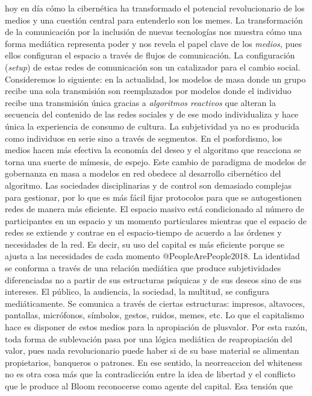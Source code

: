 \documentclass[
]{article}
\begin{document}
hoy en día cómo la cibernética ha transformado el potencial
revolucionario de los medios y una cuestión central para entenderlo son
los memes. La transformación de la comunicación por la inclusión de
nuevas tecnologías nos muestra cómo una forma mediática representa poder
y nos revela el papel clave de los \emph{medios,} pues ellos configuran
el espacio a través de flujos de comunicación. La configuración
(\emph{setup}) de estas redes de comunicación son un catalizador para el
cambio social. Consideremos lo siguiente: en la actualidad, los modelos
de masa donde un grupo recibe una sola transmisión son reemplazados por
modelos donde el individuo recibe una transmisión única gracias a
\emph{algoritmos reactivos} que alteran la secuencia del contenido de
las redes sociales y de ese modo individualiza y hace única la
experiencia de consumo de cultura. La subjetividad ya no es producida
como individuos en serie sino a través de segmentos. En el posfordismo,
los medios hacen más efectiva la economía del deseo y el algoritmo que
reacciona se torna una suerte de mímesis, de espejo. Este cambio de
paradigma de modelos de gobernanza en masa a modelos en red obedece al
desarrollo cibernético del algoritmo. Las sociedades disciplinarias y de
control son demasiado complejas para gestionar, por lo que es más fácil
fijar protocolos para que se autogestionen redes de manera más
eficiente. El espacio masivo está condicionado al número de
participantes en un espacio y un momento particulares mientras que el
espacio de redes se extiende y contrae en el espacio-tiempo de acuerdo a
las órdenes y necesidades de la red. Es decir, su uso del capital es más
eficiente porque se ajusta a las necesidades de cada momento
@PeopleArePeople2018. La identidad se conforma a través de una relación
mediática que produce subjetividades diferenciadas no a partir de sus
estructuras psíquicas y de sus deseos sino de sus intereses. El público,
la audiencia, la sociedad, la multitud, se configura mediáticamente. Se
comunica a través de ciertas estructuras: impresos, altavoces,
pantallas, micrófonos, símbolos, gestos, ruidos, memes, etc. Lo que el
capitalismo hace es disponer de estos medios para la apropiación de
plusvalor. Por esta razón, toda forma de sublevación pasa por una lógica
mediática de reapropiación del valor, pues nada revolucionario puede
haber si de su base material se alimentan propietarios, banqueros o
patrones. En ese sentido, la neorreaccion del whiteness no es otra cosa
más que la contradicción entre la idea de libertad y el conflicto que le
produce al Bloom reconocerse como agente del capital. Esa tensión que
\end{document}
